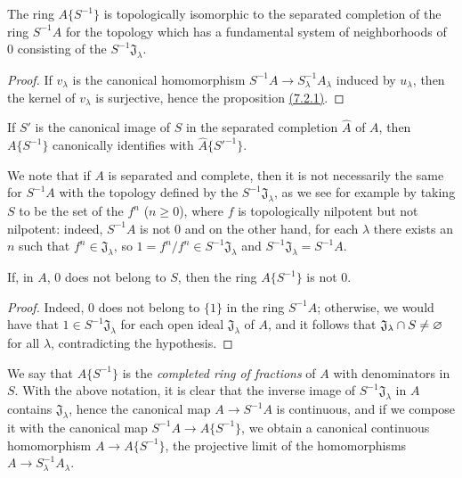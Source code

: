 \begin{prop}[7.6.2]
\label{prop-0.7.6.2}
The ring $A\{S^{-1}\}$ is topologically isomorphic to the separated completion of the ring
$S^{-1}A$ for the topology which has a fundamental system of neighborhoods of $0$ consisting of
the $S^{-1}\mathfrak{J}_\lambda$.
\end{prop}

\begin{proof}
\label{proof-prop-0.7.6.2}
If $v_\lambda$ is the canonical homomorphism $S^{-1}A\to S_\lambda^{-1}A_\lambda$ induced
by $u_\lambda$, then the kernel of $v_\lambda$ is surjective, hence the proposition
\hyperref[env-0.7.2.1]{(7.2.1)}.
\end{proof}

\begin{cor}[7.6.3]
\label{cor-0.7.6.3}
If $S'$ is the canonical image of $S$ in the separated completion $\widehat{A}$ of $A$, then
$A\{S^{-1}\}$ canonically identifies with $\widehat{A}\{{S'}^{-1}\}$.
\end{cor}

We note that if $A$ is separated and complete, then it is not necessarily the same for
$S^{-1}A$ with the topology defined by the $S^{-1}\mathfrak{J}_\lambda$, as we see for example
by taking $S$ to be the set of the $f^n$ ($n\geqslant 0$), where $f$ is topologically nilpotent
but not nilpotent: indeed, $S^{-1}A$ is not $0$ and on the other hand, for each $\lambda$ there
exists an $n$ such that $f^n\in\mathfrak{J}_\lambda$, so $1=f^n/f^n\in S^{-1}\mathfrak{J}_\lambda$
and $S^{-1}\mathfrak{J}_\lambda=S^{-1}A$.

\begin{cor}[7.6.4]
\label{cor-0.7.6.4}
If, in $A$, $0$ does not belong to $S$, then the ring $A\{S^{-1}\}$ is not $0$.
\end{cor}

\begin{proof}
\label{proof-cor-0.7.6.4}
Indeed, $0$ does not belong to $\{1\}$ in the ring $S^{-1}A$; otherwise, we would have that
$1\in S^{-1}\mathfrak{J}_\lambda$ for each open ideal $\mathfrak{J}_\lambda$ of $A$, and it
follows that $\mathfrak{J}_\lambda\cap S\neq\varnothing$ for all $\lambda$, contradicting the
hypothesis.
\end{proof}

\begin{env}[7.6.5]
\label{env-0.7.6.5}
We say that $A\{S^{-1}\}$ is the {\em completed ring of fractions} of $A$ with denominators
in $S$. With the above notation, it is clear that the inverse image of $S^{-1}\mathfrak{J}_\lambda$
in $A$ contains $\mathfrak{J}_\lambda$, hence the canonical map $A\to S^{-1}A$ is continuous, and if
we compose it with the canonical map $S^{-1}A\to A\{S^{-1}\}$, we obtain a canonical continuous
homomorphism $A\to A\{S^{-1}\}$, the projective limit of the homomorphisms
$A\to S_\lambda^{-1}A_\lambda$.
\end{env}

